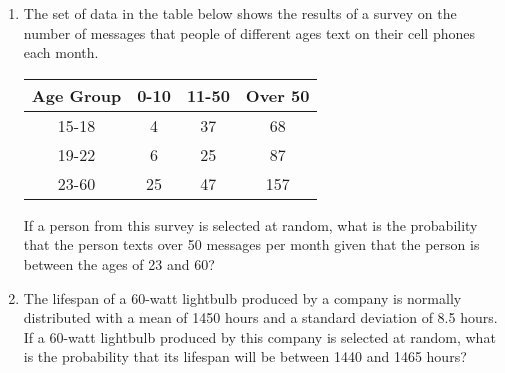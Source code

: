 \documentclass[12pt, twoside]{article}
\begin{document}
\begin{enumerate}[itemsep=0.5cm]
\item The set of data in the table below shows the results of a survey on the number of messages that people of different ages text on their cell phones each month.
\begin{center}
    \begin{tabular}{|c|c|c|c|}
        \hline
        Age Group & 0-10 & 11-50 & Over 50 \\
        \hline
        15-18 & 4 & 37 & 68 \\[0.25cm]
        \hline
        19-22 & 6 & 25 & 87 \\[0.25cm]
        \hline
        23-60 & 25 & 47 & 157 \\[0.25cm]
        \hline
    \end{tabular}
\end{center}
If a person from this survey is selected at random, what is the probability that the person texts over 50 messages per month given that the person is between the ages of 23 and 60?  \vspace{3cm}

\item The lifespan of a 60-watt lightbulb produced by a company is
normally distributed with a mean of 1450 hours and a standard
deviation of 8.5 hours. If a 60-watt lightbulb produced by this
company is selected at random, what is the probability that its lifespan
will be between 1440 and 1465 hours? \vspace{3cm}



\end{enumerate}
\end{document}
